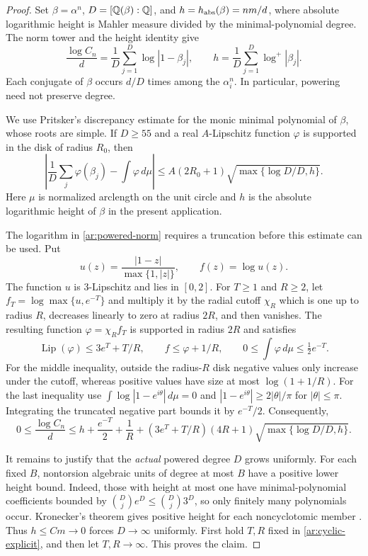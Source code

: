 \begin{proof}
Set $\beta=\alpha^n$, $D=[\mathbb Q(\beta):\mathbb Q]$, and $h=h_{\rm abs}(\beta)=nm/d$, where absolute logarithmic height is Mahler measure divided by the minimal-polynomial degree.
The norm tower and the height identity give
\begin{equation}
 \frac{\log C_n}{d}=\frac1D\sum_{j=1}^D\log|1-\beta_j|,
 \qquad h=\frac1D\sum_{j=1}^D\log^+|\beta_j|.
 \label{ar:powered-norm}
\end{equation}
Each conjugate of $\beta$ occurs $d/D$ times among the $\alpha_i^n$.
In particular, powering need not preserve degree.

We use Pritsker's discrepancy estimate \cite[Theorem~3.1]{Pri11} for the monic minimal polynomial of $\beta$, whose roots are simple.
If $D\ge55$ and a real $A$-Lipschitz function $\varphi$ is supported in the disk of radius $R_0$, then
\begin{equation}
 \left|\frac1D\sum_j\varphi(\beta_j)-\int\varphi\,d\mu\right|
 \le A(2R_0+1)
       \sqrt{\max\{\log D/D,h\}}.
 \label{ar:pritsker}
\end{equation}
Here $\mu$ is normalized arclength on the unit circle and $h$ is the absolute logarithmic height of $\beta$ in the present application.

The logarithm in \eqref{ar:powered-norm} requires a truncation before this estimate can be used.
Put
\[
 u(z)=\frac{|1-z|}{\max\{1,|z|\}},\qquad f(z)=\log u(z).
\]
The function $u$ is $3$-Lipschitz and lies in $[0,2]$.
For $T\ge1$ and $R\ge2$, let $f_T=\log\max\{u,e^{-T}\}$ and multiply it by the radial cutoff $\chi_R$ which is one up to radius $R$, decreases linearly to zero at radius $2R$, and then vanishes.
The resulting function $\varphi=\chi_R f_T$ is supported in radius $2R$ and satisfies
\[
 \operatorname{Lip}(\varphi)\le3e^T+T/R,
 \qquad f\le\varphi+1/R,
 \qquad 0\le\int\varphi\,d\mu\le\tfrac12e^{-T}.
\]
For the middle inequality, outside the radius-$R$ disk negative values only increase under the cutoff, whereas positive values have size at most $\log(1+1/R)$.
For the last inequality use $\int\log|1-e^{i\theta}|\,d\mu=0$ and $|1-e^{i\theta}|\ge2|\theta|/\pi$ for $|\theta|\le\pi$.
Integrating the truncated negative part bounds it by $e^{-T}/2$.
Consequently,
\begin{equation}
 0\le\frac{\log C_n}{d}
 \le h+\frac{e^{-T}}2+\frac1R
 +(3e^T+T/R)(4R+1)\sqrt{\max\{\log D/D,h\}}.
 \label{ar:cyclic-explicit}
\end{equation}

It remains to justify that the \emph{actual} powered degree $D$ grows uniformly.
For each fixed $B$, nontorsion algebraic units of degree at most $B$ have a positive lower height bound.
Indeed, those with height at most one have minimal-polynomial coefficients bounded by $\binom Dj e^D\le\binom Dj3^D$, so only finitely many polynomials occur.
Kronecker's theorem gives positive height for each noncyclotomic member \cite[p.~322]{Smy08}.
Thus $h\le Cm\to0$ forces $D\to\infty$ uniformly.
First hold $T,R$ fixed in \eqref{ar:cyclic-explicit}, and then let $T,R\to\infty$.
This proves the claim.
\end{proof}

